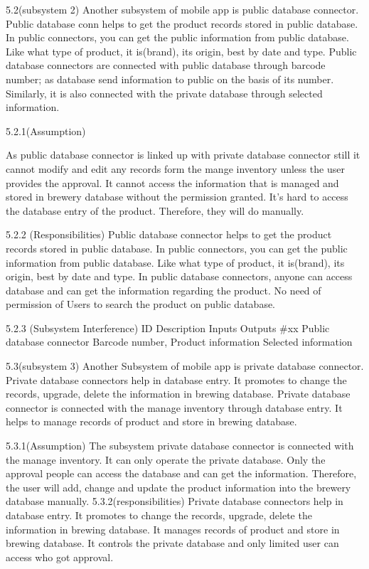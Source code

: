5.2(subsystem 2)
Another subsystem of mobile app is public database connector. Public database conn helps to get the product records stored in public database. In public connectors, you can get the public information from public database. Like what type of product, it is(brand), its origin, best by date and type. Public database connectors are connected with public database through barcode number; as database send information to public on the basis of its number. Similarly, it is also connected with the private database through selected information. 

5.2.1(Assumption)

As public database connector is linked up with private database connector still it cannot modify and edit any records form the mange inventory unless the user provides the approval. It cannot access the information that is managed and stored in brewery database without the permission granted. It’s hard to access the database entry of the product. Therefore, they will do manually.


5.2.2
(Responsibilities)
Public database connector helps to get the product records stored in public database. In public connectors, you can get the public information from public database. Like what type of product, it is(brand), its origin, best by date and type. In public database connectors, anyone can access database and can get the information regarding the product. No need of permission of Users to search the product on public database. 

5.2.3 (Subsystem Interference)
ID 	Description 	Inputs 	Outputs 
#xx 	 Public database connector	Barcode number, Product information	Selected information 


5.3(subsystem 3)
Another Subsystem of mobile app is private database connector. Private database connectors help in database entry. It promotes to change the records, upgrade, delete the information in brewing database. Private database connector is connected with the manage inventory through database entry. It helps to manage records of product and store in brewing database. 

5.3.1(Assumption)
The subsystem private database connector is connected with the manage inventory. It can only operate the private database. Only the approval people can access the database and can get the information. Therefore, the user will add, change and update the product information into the brewery database manually.
5.3.2(responsibilities)
Private database connectors help in database entry. It promotes to change the records, upgrade, delete the information in brewing database. It manages records of product and store in brewing database. It controls the private database and only limited user can access who got approval. 



